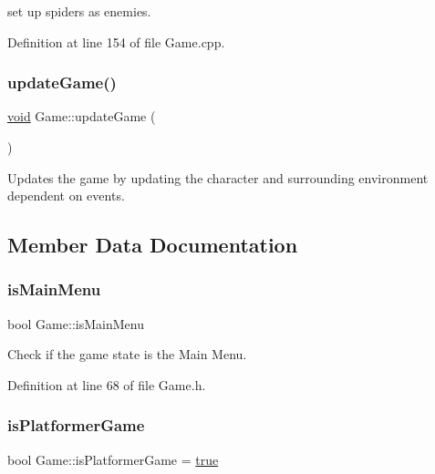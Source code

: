 set up spiders as enemies. 



Definition at line 154 of file Game.\+cpp.

\mbox{\label{class_game_a67a8c5c0356c9ad33fac1abc435a3746}} 
\subsubsection{\texorpdfstring{updateGame()}{updateGame()}}
{\footnotesize\ttfamily \mbox{\hyperlink{_s_d_l__opengles2__gl2ext_8h_ae5d8fa23ad07c48bb609509eae494c95}{void}} Game\+::update\+Game (\begin{DoxyParamCaption}{ }\end{DoxyParamCaption})}



Updates the game by updating the character and surrounding environment dependent on events. 



\subsection{Member Data Documentation}
\mbox{\label{class_game_a7677fecae8054a7eb350c61dd6c0246a}} 
\subsubsection{\texorpdfstring{isMainMenu}{isMainMenu}}
{\footnotesize\ttfamily bool Game\+::is\+Main\+Menu}



Check if the game state is the Main Menu. 



Definition at line 68 of file Game.\+h.

\mbox{\label{class_game_ac847b4177276b33b3159a59f8ba45f88}} 
\subsubsection{\texorpdfstring{isPlatformerGame}{isPlatformerGame}}
{\footnotesize\ttfamily bool Game\+::is\+Platformer\+Game = \mbox{\hyperlink{ordinals_8h_a41f9c5fb8b08eb5dc3edce4dcb37fee7}{true}}}



